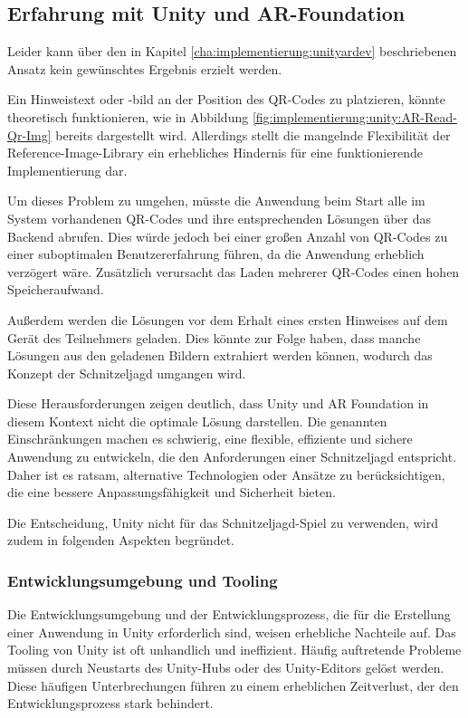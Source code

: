 \subsection{Erfahrung mit Unity und AR-Foundation}

Leider kann über den in Kapitel \ref{cha:implementierung:unityardev} beschriebenen Ansatz kein gewünschtes Ergebnis erzielt werden.

Ein Hinweistext oder -bild an der Position des QR-Codes zu platzieren, könnte theoretisch funktionieren, wie in Abbildung \ref{fig:implementierung:unity:AR-Read-Qr-Img} bereits dargestellt wird. Allerdings stellt die mangelnde Flexibilität der Reference-Image-Library ein erhebliches Hindernis für eine funktionierende Implementierung dar.

Um dieses Problem zu umgehen, müsste die Anwendung beim Start alle im System vorhandenen QR-Codes und ihre entsprechenden Lösungen über das Backend abrufen. Dies würde jedoch bei einer großen Anzahl von QR-Codes zu einer suboptimalen Benutzererfahrung führen, da die Anwendung erheblich verzögert wäre. Zusätzlich verursacht das Laden mehrerer QR-Codes einen hohen Speicheraufwand. 

Außerdem werden die Lösungen vor dem Erhalt eines ersten Hinweises auf dem Gerät des Teilnehmers geladen. Dies könnte zur Folge haben, dass manche Lösungen aus den geladenen Bildern extrahiert werden können, wodurch das Konzept der Schnitzeljagd umgangen wird.

Diese Herausforderungen zeigen deutlich, dass Unity und AR Foundation in diesem Kontext nicht die optimale Lösung darstellen. Die genannten Einschränkungen machen es schwierig, eine flexible, effiziente und sichere Anwendung zu entwickeln, die den Anforderungen einer Schnitzeljagd entspricht. Daher ist es ratsam, alternative Technologien oder Ansätze zu berücksichtigen, die eine bessere Anpassungsfähigkeit und Sicherheit bieten.

Die Entscheidung, Unity nicht für das Schnitzeljagd-Spiel zu verwenden, wird zudem in folgenden Aspekten begründet.

\subsubsection{Entwicklungsumgebung und Tooling}

Die Entwicklungsumgebung und der Entwicklungsprozess, die für die Erstellung einer Anwendung in Unity erforderlich sind, weisen erhebliche Nachteile auf. Das Tooling von Unity ist oft unhandlich und ineffizient. Häufig auftretende Probleme müssen durch Neustarts des Unity-Hubs oder des Unity-Editors gelöst werden. Diese häufigen Unterbrechungen führen zu einem erheblichen Zeitverlust, der den Entwicklungsprozess stark behindert.

